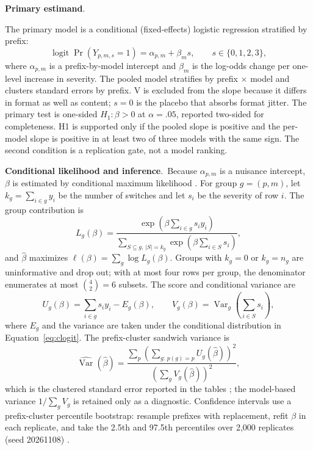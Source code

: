 \documentclass[a4paper,fleqn]{cas-sc}
\begin{document}
\noindent\textbf{Primary estimand}.\

The primary model is a conditional (fixed-effects) logistic regression stratified by prefix:
\begin{equation}
  \operatorname{logit}\Pr(Y_{p,m,s}=1) = \alpha_{p,m} + \beta_m s,
  \qquad s \in \{0,1,2,3\},
  \label{eq:primary}
\end{equation}
where $\alpha_{p,m}$ is a prefix-by-model intercept and $\beta_m$ is the log-odds change per
one-level increase in severity. The pooled model stratifies by prefix $\times$ model and clusters
standard errors by prefix. V is excluded from the slope because it differs in format as well as
content; $s=0$ is the placebo that absorbs format jitter. The primary test is one-sided
$H_1:\beta>0$ at $\alpha=.05$, reported two-sided for completeness. H1 is supported only if the
pooled slope is positive and the per-model slope is positive in at least two of three models with
the same sign. The second condition is a replication gate, not a model ranking.

\noindent\textbf{Conditional likelihood and inference}.\
Because $\alpha_{p,m}$ is a nuisance intercept, $\beta$ is estimated by conditional maximum
likelihood \cite{chamberlain1980}. For group $g=(p,m)$, let $k_g=\sum_{i\in g}y_i$ be the number of switches and let
$s_i$ be the severity of row $i$. The group contribution is
\begin{equation}
  L_g(\beta)=
  \frac{\exp\!\left(\beta\sum_{i\in g}s_i y_i\right)}
       {\sum_{S\subseteq g,\,|S|=k_g}\exp\!\left(\beta\sum_{i\in S}s_i\right)},
  \label{eq:clogit}
\end{equation}
and $\hat\beta$ maximizes $\ell(\beta)=\sum_g\log L_g(\beta)$. Groups with $k_g=0$ or
$k_g=n_g$ are uninformative and drop out; with at most four rows per group, the denominator
enumerates at most $\binom{4}{2}=6$ subsets. The score and conditional variance are
\begin{equation}
  U_g(\beta)=\sum_{i\in g}s_i y_i-E_g(\beta),
  \qquad
  V_g(\beta)=\operatorname{Var}_g\!\left(\sum_{i\in S}s_i\right),
  \label{eq:score}
\end{equation}
where $E_g$ and the variance are taken under the conditional distribution in
Equation~\ref{eq:clogit}. The prefix-cluster sandwich variance is
\begin{equation}
  \widehat{\operatorname{Var}}(\hat\beta)=
  \frac{\sum_{p}\left(\sum_{g:\,p(g)=p}U_g(\hat\beta)\right)^2}
       {\left(\sum_{g}V_g(\hat\beta)\right)^2},
  \label{eq:sandwich}
\end{equation}
which is the clustered standard error reported in the tables \cite{cameron2015}; the model-based
variance $1/\sum_g V_g$ is retained only as a diagnostic. Confidence intervals use a prefix-cluster
percentile bootstrap: resample prefixes with replacement, refit $\beta$ in each replicate, and
take the 2.5th and 97.5th percentiles over 2{,}000 replicates (seed 20261108) \cite{efron1979}.
\end{document}
